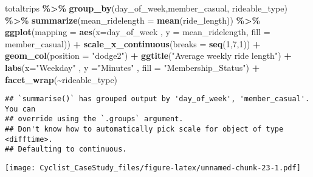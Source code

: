 \documentclass[
]{article}
\newenvironment{Shaded}{\begin{snugshade}}{\end{snugshade}}
\newcommand{\AttributeTok}[1]{\textcolor[rgb]{0.13,0.29,0.53}{#1}}
\newcommand{\DecValTok}[1]{\textcolor[rgb]{0.00,0.00,0.81}{#1}}
\newcommand{\FunctionTok}[1]{\textcolor[rgb]{0.13,0.29,0.53}{\textbf{#1}}}
\newcommand{\NormalTok}[1]{#1}
\newcommand{\SpecialCharTok}[1]{\textcolor[rgb]{0.81,0.36,0.00}{\textbf{#1}}}
\newcommand{\StringTok}[1]{\textcolor[rgb]{0.31,0.60,0.02}{#1}}
\begin{document}
\begin{Shaded}
\begin{Highlighting}[]
\NormalTok{totaltrips }\SpecialCharTok{\%\textgreater{}\%} \FunctionTok{group\_by}\NormalTok{(day\_of\_week,member\_casual, rideable\_type) }\SpecialCharTok{\%\textgreater{}\%} \FunctionTok{summarize}\NormalTok{(}\AttributeTok{mean\_ridelength =} \FunctionTok{mean}\NormalTok{(ride\_length)) }\SpecialCharTok{\%\textgreater{}\%} \FunctionTok{ggplot}\NormalTok{(}\AttributeTok{mapping =} \FunctionTok{aes}\NormalTok{(}\AttributeTok{x=}\NormalTok{day\_of\_week , }\AttributeTok{y =}\NormalTok{ mean\_ridelength, }\AttributeTok{fill =}\NormalTok{ member\_casual)) }\SpecialCharTok{+} \FunctionTok{scale\_x\_continuous}\NormalTok{(}\AttributeTok{breaks =}  \FunctionTok{seq}\NormalTok{(}\DecValTok{1}\NormalTok{,}\DecValTok{7}\NormalTok{,}\DecValTok{1}\NormalTok{))    }\SpecialCharTok{+} \FunctionTok{geom\_col}\NormalTok{(}\AttributeTok{position =} \StringTok{"dodge2"}\NormalTok{) }\SpecialCharTok{+} \FunctionTok{ggtitle}\NormalTok{(}\StringTok{"Average weekly ride length"}\NormalTok{) }\SpecialCharTok{+} \FunctionTok{labs}\NormalTok{(}\AttributeTok{x=}\StringTok{"Weekday"}\NormalTok{ , }\AttributeTok{y =}\StringTok{"Minutes"}\NormalTok{ , }\AttributeTok{fill =} \StringTok{"Membership\_Status"}\NormalTok{) }\SpecialCharTok{+} \FunctionTok{facet\_wrap}\NormalTok{(}\SpecialCharTok{\textasciitilde{}}\NormalTok{rideable\_type)}
\end{Highlighting}
\end{Shaded}

\begin{verbatim}
## `summarise()` has grouped output by 'day_of_week', 'member_casual'. You can
## override using the `.groups` argument.
## Don't know how to automatically pick scale for object of type <difftime>.
## Defaulting to continuous.
\end{verbatim}

\texttt{[image: Cyclist\_CaseStudy\_files/figure-latex/unnamed-chunk-23-1.pdf]}
\end{document}
